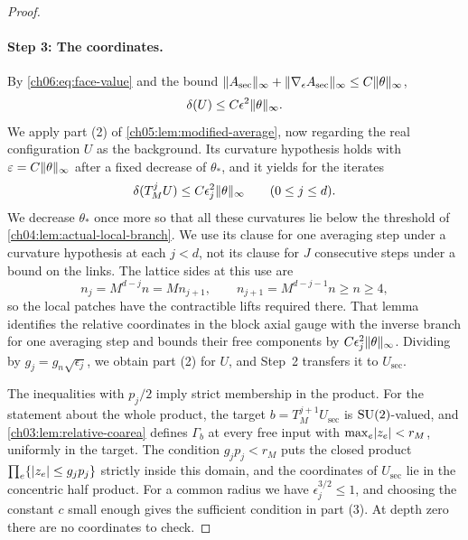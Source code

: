 \begin{proof}
\paragraph{Step 3: The coordinates.}
By \eqref{ch06:eq:face-value} and the bound $\lVert A_{\mathrm{sec}}\rVert_\infty+\lVert \nabla_\epsilon A_{\mathrm{sec}}\rVert_\infty\le C\lVert \theta\rVert_\infty$,
\begin{equation}\label{ch06:eq:section-curvature}
 \delta(U)\le C\epsilon^2\lVert \theta\rVert_\infty.
\end{equation}
We apply part (2) of \cref{ch05:lem:modified-average}, now regarding the real configuration $U$ as the background. Its curvature hypothesis holds with $\varepsilon=C\lVert \theta\rVert_\infty$ after a fixed decrease of $\theta_*$, and it yields for the iterates
\[
 \delta(T_M^jU)\le C\epsilon_j^2\lVert \theta\rVert_\infty\qquad(0\le j\le d).
\]
We decrease $\theta_*$ once more so that all these curvatures lie below the threshold of \cref{ch04:lem:actual-local-branch}. We use its clause for one averaging step under a curvature hypothesis at each $j<d$, not its clause for $J$ consecutive steps under a bound on the links. The lattice sides at this use are
\begin{equation}\label{ch06:eq:one-shell-sides}
 n_j=M^{d-j}n=Mn_{j+1},\qquad n_{j+1}=M^{d-j-1}n\ge n\ge4,
\end{equation}
so the local patches have the contractible lifts required there. That lemma identifies the relative coordinates in the block axial gauge with the inverse branch for one averaging step and bounds their free components by $C\epsilon_j^2\lVert \theta\rVert_\infty$. Dividing by $g_j=g_n\sqrt{\epsilon_j}$, we obtain part (2) for $U$, and Step~2 transfers it to $U_{\mathrm{sec}}$.

The inequalities with $p_j/2$ imply strict membership in the product. For the statement about the whole product, the target $b=T_M^{j+1}U_{\mathrm{sec}}$ is $\mathrm{SU}(2)$-valued, and \cref{ch03:lem:relative-coarea} defines $\Gamma_b$ at every free input with $\max_e\lvert z_e\rvert<r_M$, uniformly in the target. The condition $g_jp_j<r_M$ puts the closed product $\prod_e\{\lvert z_e\rvert\le g_jp_j\}$ strictly inside this domain, and the coordinates of $U_{\mathrm{sec}}$ lie in the concentric half product. For a common radius we have $\epsilon_j^{3/2}\le1$, and choosing the constant $c$ small enough gives the sufficient condition in part (3). At depth zero there are no coordinates to check.


\end{proof}
